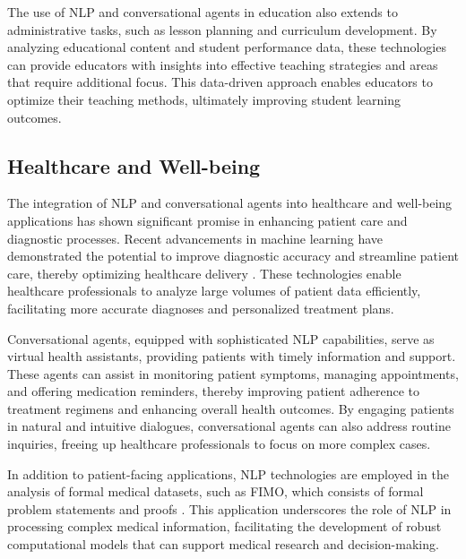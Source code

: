 The use of NLP and conversational agents in education also extends to administrative tasks, such as lesson planning and curriculum development. By analyzing educational content and student performance data, these technologies can provide educators with insights into effective teaching strategies and areas that require additional focus. This data-driven approach enables educators to optimize their teaching methods, ultimately improving student learning outcomes.


\subsection{Healthcare and Well-being} \label{subsec:Healthcare and Well-being}

The integration of NLP and conversational agents into healthcare and well-being applications has shown significant promise in enhancing patient care and diagnostic processes. Recent advancements in machine learning have demonstrated the potential to improve diagnostic accuracy and streamline patient care, thereby optimizing healthcare delivery \cite{shanks2004speculationgraphcomputationarchitectures}. These technologies enable healthcare professionals to analyze large volumes of patient data efficiently, facilitating more accurate diagnoses and personalized treatment plans.



Conversational agents, equipped with sophisticated NLP capabilities, serve as virtual health assistants, providing patients with timely information and support. These agents can assist in monitoring patient symptoms, managing appointments, and offering medication reminders, thereby improving patient adherence to treatment regimens and enhancing overall health outcomes. By engaging patients in natural and intuitive dialogues, conversational agents can also address routine inquiries, freeing up healthcare professionals to focus on more complex cases.



In addition to patient-facing applications, NLP technologies are employed in the analysis of formal medical datasets, such as FIMO, which consists of formal problem statements and proofs \cite{liu2023fimochallengeformaldataset}. This application underscores the role of NLP in processing complex medical information, facilitating the development of robust computational models that can support medical research and decision-making.



